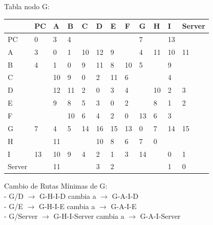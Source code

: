 \documentclass[a4paper]{article}
\begin{document}
\begin{table}[h]
Tabla nodo G:\\
\begin{tabular}{|l|l|l|l|l|l|l|l|l|l|l|l|}
\hline
       & PC & A  & B  & C  & D  & E  & F  & G  & H  & I  & Server \\ \hline
PC     & 0  & 3  & 4  &    &    &    &    & 7  &    & 13 &        \\ \hline
A      & 3  & 0  & 1  & 10 & 12 & 9  &    & 4  & 11 & 10 & 11     \\ \hline
B      & 4  & 1  & 0  & 9  & 11 & 8  & 10 & 5  &    & 9  &        \\ \hline
C      &    & 10 & 9  & 0  & 2  & 11 & 6  &    &    & 4  &        \\ \hline
D      &    & 12 & 11 & 2  & 0  & 3  & 4  &    & 10 & 2  & 3      \\ \hline
E      &    & 9  & 8  & 5  & 3  & 0  & 2  &    & 8  & 1  & 2      \\ \hline
F      &    &    & 10 & 6  & 4  & 2  & 0  & 13 & 6  & 3  &        \\ \hline
G      & 7  & 4  & 5  & 14 & 16 & 15 & 13 & 0  & 7  & 14 & 15     \\ \hline
H      &    & 11 &    &    & 10 & 8  & 6  & 7  & 0  &    &        \\ \hline
I      & 13 & 10 & 9  & 4  & 2  & 1  & 3  & 14 &    & 0  & 1      \\ \hline
Server &    & 11 &    &    & 3  & 2  &    &    &    & 1  & 0      \\ \hline
\end{tabular}

Cambio de Rutas Mínimas de G:\\
-	G/D  $\rightarrow$  G-H-I-D  cambia a $\rightarrow$ G-A-I-D\\
-	G/E  $\rightarrow$  G-H-I-E  cambia a  $\rightarrow$  G-A-I-E\\
-	G/Server  $\rightarrow$  G-H-I-Server  cambia a  $\rightarrow$  G-A-I-Server\\

\end{table}
\clearpage
\end{document}
